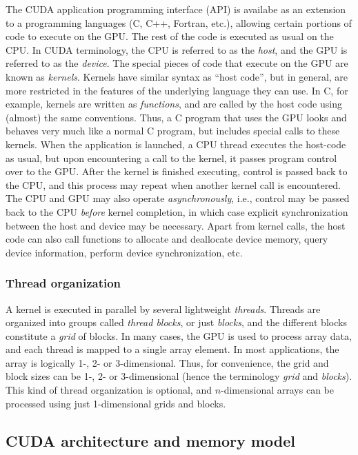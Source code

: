 The CUDA application programming interface (API)
is availabe as an extension to
a programming languages (C, C++, Fortran, etc.),
allowing certain portions of code to execute on the GPU.
The rest of the code is executed as usual on the CPU.
In CUDA terminology,
the CPU is referred to as the \emph{host},
and the GPU is referred to as the \emph{device}.
The special pieces of code
that execute on the GPU are known as \emph{kernels}.
Kernels have similar syntax
as ``host code'',
but in general,
are more restricted in the
features of the underlying language they can use.
In C, for example, kernels are written as \emph{functions},
and are called by the host code
using (almost) the same conventions.
Thus, a C program that uses the GPU
looks and behaves very much like a normal C program,
but includes special calls to these kernels.
When the application is launched,
a CPU thread executes the host-code as usual,
but upon encountering a call to the kernel,
it passes program control over to the GPU.
After the kernel is finished executing,
control is passed back to the CPU,
and this process may repeat when another kernel call is encountered.
The CPU and GPU may also operate \emph{asynchronously},
i.e.,
control may be passed back to the CPU \emph{before} kernel completion,
in which case
explicit synchronization between the host and device may be necessary.
Apart from kernel calls, the host code can also call functions to
allocate and deallocate device memory,
query device information,
perform device synchronization, etc.

\subsubsection{Thread organization}

A kernel is executed in parallel by
several lightweight \emph{threads}.
Threads are organized into groups called
\emph{thread blocks}, or just \emph{blocks},
and the different blocks constitute a
\emph{grid} of blocks.
In many cases,
the GPU is used to process array data,
and each thread is mapped to a single array element.
In most applications,
the array is logically 1-, 2- or 3-dimensional.
Thus, for convenience, the grid and block sizes
can be 1-, 2- or 3-dimensional
(hence the terminology \emph{grid} and \emph{blocks}).
This kind of thread organization is optional,
and $n$-dimensional arrays can be processed
using just 1-dimensional grids and blocks.

\subsection{CUDA architecture and memory model}

